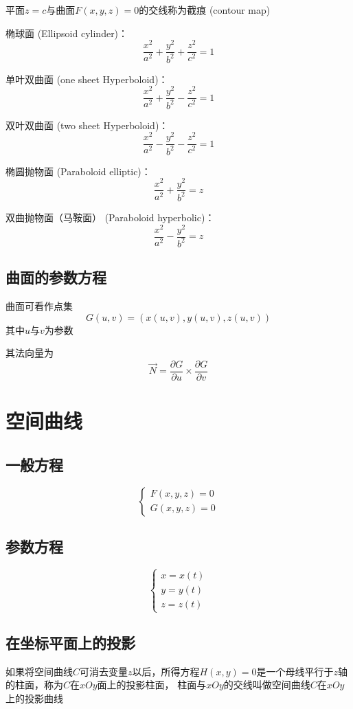 \documentclass[UTF8]{ctexart}
\begin{document}
平面$z=c$与曲面$F(x,y,z)=0$的交线称为截痕 (contour map)

椭球面 (Ellipsoid cylinder)：
\[\frac{x^2}{a^2}+\frac{y^2}{b^2}+\frac{z^2}{c^2}=1\]

单叶双曲面 (one sheet Hyperboloid)：
\[\frac{x^2}{a^2}+\frac{y^2}{b^2}-\frac{z^2}{c^2}=1\]

双叶双曲面 (two sheet Hyperboloid)：
\[\frac{x^2}{a^2}-\frac{y^2}{b^2}-\frac{z^2}{c^2}=1\]

椭圆抛物面 (Paraboloid elliptic)：
\[\frac{x^2}{a^2}+\frac{y^2}{b^2}=z\]

双曲抛物面（马鞍面） (Paraboloid hyperbolic)：
\[\frac{x^2}{a^2}-\frac{y^2}{b^2}=z\]

\subsection*{曲面的参数方程}
曲面可看作点集
\[G(u,v) = (x(u,v),y(u,v),z(u,v))\]
其中$u$与$v$为参数

其法向量为
\[\vec{N} =  \frac{\partial G}{\partial u}\times\frac{\partial G}{\partial v}\]

\section*{空间曲线}
\subsection*{一般方程}
\[\begin{cases}
F(x,y,z)=0\\
G(x,y,z)=0
\end{cases}\]
\subsection*{参数方程}
\[\begin{cases}
x=x(t)\\
y=y(t)\\
z=z(t)
\end{cases}\]
\subsection*{在坐标平面上的投影}
如果将空间曲线$C$可消去变量$z$以后，所得方程$H(x,y)=0$是一个母线平行于$z$轴的柱面，称为$C$在$xOy$面上的投影柱面，
柱面与$xOy$的交线叫做空间曲线$C$在$xOy$上的投影曲线
\end{document}
